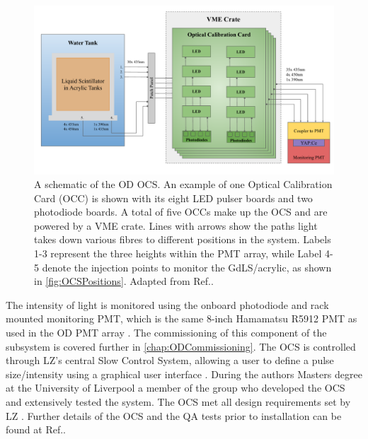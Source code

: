 \begin{figure}[h!]
    \centering
    \includegraphics[width=\linewidth]{figures/LZ/OCSSchematics.pdf}
    \caption{A schematic of the OD OCS. An example of one Optical Calibration Card (OCC) is shown with its eight LED pulser boards and two photodiode boards. A total of five OCCs make up the OCS and are powered by a VME crate. Lines with arrows show the paths light takes down various fibres to different positions in the system. Labels 1-3 represent the three heights within the PMT array, while Label 4-5 denote the injection points to monitor the GdLS/acrylic, as shown in \autoref{fig:OCSPositions}. Adapted from Ref.\cite{Turner:2021qvi,LZ:2024bsz}.}
    \label{fig:OCSSchematic}
\end{figure}
The intensity of light is monitored using the onboard photodiode and rack mounted monitoring PMT, which is the same 8-inch Hamamatsu R5912 PMT as used in the OD PMT array \cite{Turner:2021qvi}. The commissioning of this component of the subsystem is covered further in \autoref{chap:ODCommissioning}. The OCS is controlled through LZ's central Slow Control System, allowing a user to define a pulse size/intensity using a graphical user interface \cite{hbirch:thesis}.
During the authors Masters degree at the University of Liverpool a member of the group who developed the OCS and extensively tested the system. The OCS met all design requirements set by LZ \cite{Turner:2021qvi}. Further details of the OCS and the QA tests prior to installation can be found at Ref.\cite{hbirch:thesis,Turner:2021qvi}. 

